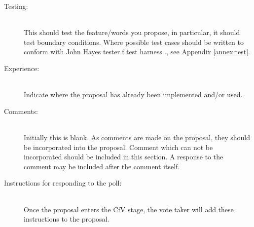 \begin{description}
\item[Testing:] ~\\
	This should test the feature/words you propose, in particular, it
	should test boundary conditions.  Where possible test cases should
	be written to conform with John Hayes tester.f test harness%
	\ifrelease.\else, see Appendix \ref{annex:test}.\fi

\item[Experience:] ~\\
	Indicate where the proposal has already been implemented and/or
	used.

\item[Comments:] ~\\
	Initially this is blank.  As comments are made on the proposal,
	they should be incorporated into the proposal.  Comment which can
	not be incorporated should be included in this section.  A response
	to the comment may be included after the comment itself.

\item[Instructions for responding to the poll:] ~\\
	Once the proposal enters the CfV stage, the vote taker will add
	these instructions to the proposal.
\end{description}
